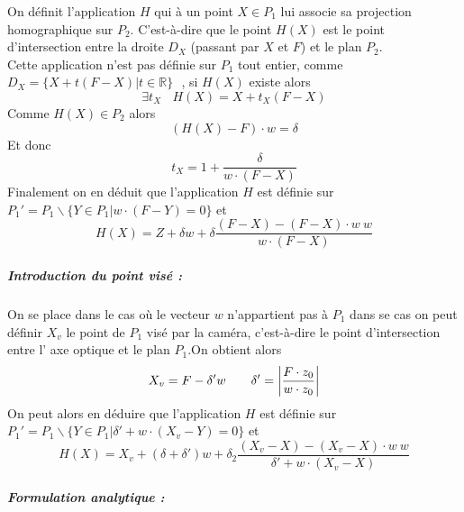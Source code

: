 On définit l'application $H$ qui à un point $X\in P_{1}$ lui associe sa projection homographique sur $P_{2}$. C'est-à-dire que le point $H(X)$ est le point d'intersection entre la droite $D_{X}$ (passant par $X$ et $F$) et le plan $P_{2}$.\\
Cette application n'est pas définie sur $P_{1}$ tout entier, comme $D_{X}=\{X+t(F-X)|t\in\mathbb{R}\}~~~$, si $H(X)$ existe alors 
\begin{equation*}
\exists t_{X}~~~~H(X)=X+t_{X}(F-X)
\end{equation*}
Comme $H(X)\in P_{2}$ alors
\begin{equation*}
(H(X)-F)\cdot w =\delta
\end{equation*}
Et donc 
\begin{equation*}
t_{X}=1+\frac{\delta}{w\cdot(F-X)}
\end{equation*}
Finalement on en déduit que l'application $H$ est définie sur $P_{1}'=P_{1}\backslash \{Y\in P_{1}|w\cdot(F-Y)=0\}$ et 
\begin{equation*}
H(X)=Z+\delta w+\delta \frac{(F-X)-(F-X)\cdot w~ w}{w\cdot (F-X)}
\end{equation*}

\subparagraph{Introduction du point visé :}
On se place dans le cas où le vecteur $w$ n'appartient pas à $P_{1}$ dans se cas on peut définir $X_{v}$ le point de $P_{1}$ visé par la caméra, c'est-à-dire le point d'intersection entre l' axe optique et le plan $P_{1}$.On obtient alors 
\begin{equation*}
X_{v}=F-\delta'w~~~~~~\delta'=\small{\left|\frac{F \cdot z_{0}}{w\cdot z_{0}} \right|}
\end{equation*}
On peut alors en déduire que l'application $H$ est définie sur\\ $P_{1}'=P_{1}\backslash \{Y\in P_{1}|\delta'+w\cdot(X_{v}-Y)=0\}$ et 
\begin{equation*}
H(X)=X_{v}+(\delta+\delta')w+\delta_{2}\frac{(X_{v}-X)-(X_{v}-X)\cdot w~ w}{\delta'+w\cdot (X_{v}-X)}
\end{equation*}



\subparagraph{Formulation analytique :}

